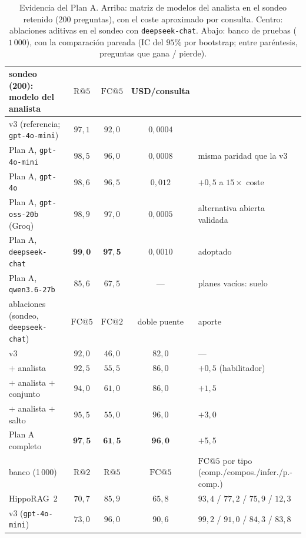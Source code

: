 \documentclass[11pt,a4paper]{article}
\newcommand{\hippo}{HippoRAG~2}
\begin{document}
\begin{table}[p]
\centering\footnotesize\setlength{\tabcolsep}{4pt}
\caption{Evidencia del Plan A. Arriba: matriz de modelos del analista en
el sondeo retenido ($200$ preguntas), con el coste aproximado por
consulta. Centro: ablaciones aditivas en el sondeo con
\texttt{deepseek-chat}. Abajo: banco de pruebas ($1\,000$), con la
comparación pareada (IC del $95\%$ por bootstrap; entre paréntesis,
preguntas que gana / pierde).}
\label{tab:plan-a}
\scriptsize\setlength{\tabcolsep}{3.5pt}
\begin{tabular}{lcccp{}}
\toprule
sondeo (200): modelo del analista & $\mathrm{R@}5$ & $\mathrm{FC@}5$ & USD/consulta & \\
\midrule
v3 (referencia; \texttt{gpt-4o-mini}) & $97{,}1$ & $92{,}0$ & $0{,}0004$ & \\
Plan A, \texttt{gpt-4o-mini} & $98{,}5$ & $96{,}0$ & $0{,}0008$ & misma paridad que la v3\\
Plan A, \texttt{gpt-4o} & $98{,}6$ & $96{,}5$ & $0{,}012$ & $+0{,}5$ a $15\times$ coste\\
Plan A, \texttt{gpt-oss-20b} (Groq) & $98{,}9$ & $97{,}0$ & $0{,}0005$ & alternativa abierta validada\\
Plan A, \texttt{deepseek-chat} & $\mathbf{99{,}0}$ & $\mathbf{97{,}5}$ & $0{,}0010$ & adoptado\\
Plan A, \texttt{qwen3.6-27b} & $85{,}6$ & $67{,}5$ & --- & planes vacíos: suelo\\
\midrule
ablaciones (sondeo, \texttt{deepseek-chat}) & $\mathrm{FC@}5$ & $\mathrm{FC@}2$ & doble puente & aporte\\
\midrule
v3 & $92{,}0$ & $46{,}0$ & $82{,}0$ & ---\\
$+$ analista & $92{,}5$ & $55{,}5$ & $86{,}0$ & $+0{,}5$ (habilitador)\\
$+$ analista $+$ conjunto & $94{,}0$ & $61{,}0$ & $86{,}0$ & $+1{,}5$\\
$+$ analista $+$ salto & $95{,}5$ & $55{,}0$ & $96{,}0$ & $+3{,}0$\\
Plan A completo & $\mathbf{97{,}5}$ & $\mathbf{61{,}5}$ & $\mathbf{96{,}0}$ & $+5{,}5$\\
\midrule
banco (1\,000) & $\mathrm{R@}2$ & $\mathrm{R@}5$ & $\mathrm{FC@}5$ & $\mathrm{FC@}5$ por tipo (comp./compos./infer./p.-comp.)\\
\midrule
\hippo{} & $70{,}7$ & $85{,}9$ & $65{,}8$ & $93{,}4$ / $77{,}2$ / $75{,}9$ / $12{,}3$\\
v3 (\texttt{gpt-4o-mini}) & $73{,}0$ & $96{,}0$ & $90{,}6$ & $99{,}2$ / $91{,}0$ / $84{,}3$ / $83{,}8$\\

\end{tabular}
\end{table}
\end{document}
